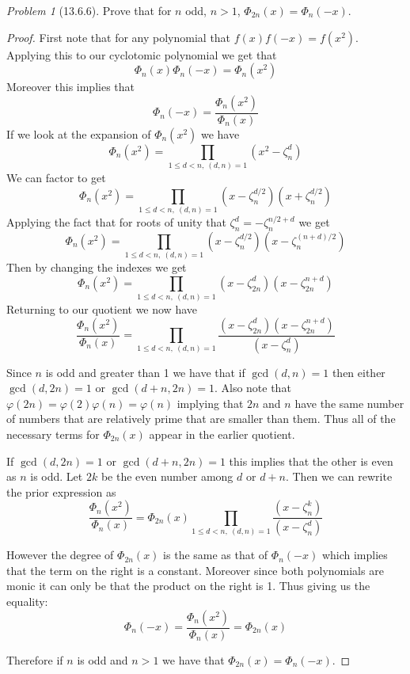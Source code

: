 \documentclass[10pt]{article}
\newcommand{\sk}{\vskip 10mm}
\theoremstyle{remark}
\newtheorem{problem}{Problem}
\theoremstyle{remark}
\begin{document}
\begin{problem}[13.6.6]
  Prove that for $n$ odd, $n>1$, $\Phi_{2n}(x)=\Phi_n(-x)$.
\end{problem}

\begin{proof}
  First note that for any polynomial that $f(x)f(-x)=f(x^2)$.
  Applying this to our cyclotomic polynomial we get that
  \[
    \Phi_n(x)\Phi_n(-x)=\Phi_n(x^2)
  \]
  Moreover this implies that
  \[
    \Phi_n(-x)=\frac{\Phi_n(x^2)}{\Phi_n(x)}
  \]
  If we look at the expansion of $\Phi_n(x^2)$ we have
  \[
    \Phi_n(x^2)=\prod_{1\leq d<n,\ (d,n)=1}(x^2-\zeta_n^d)
  \]
  We can factor to get
  \[
    \Phi_n(x^2)=\prod_{1\leq d<n,\ (d,n)=1}(x-\zeta_n^{d/2})(x+\zeta_n^{d/2})
  \]
  Applying the fact that for roots of unity that $\zeta_n^d=-\zeta_n^{n/2+d}$
  we get
  \[
    \Phi_n(x^2)=\prod_{1\leq d<n,\ (d,n)=1}(x-\zeta_n^{d/2})(x-\zeta_n^{(n+d)/2})
  \]
  Then by changing the indexes we get
  \[
    \Phi_n(x^2)=\prod_{1\leq d<n,\ (d,n)=1}(x-\zeta_{2n}^d)(x-\zeta_{2n}^{n+d})
  \]
  Returning to our quotient we now have
  \[
    \frac{\Phi_n(x^2)}{\Phi_n(x)}=\prod_{1\leq d<n,\ (d,n)=1}\frac{(x-\zeta_{2n}^d)(x-\zeta_{2n}^{n+d})}{(x-\zeta_n^d)}
  \]

  Since $n$ is odd and greater than 1 we have that if $\gcd(d,n)=1$ then either
  $\gcd(d,2n)=1$ or $\gcd(d+n,2n)=1$. Also note that $\varphi(2n)=\varphi(2)\varphi(n)=\varphi(n)$ implying
  that $2n$ and $n$ have the same number of numbers that are relatively prime that
  are smaller than them. Thus all of the necessary terms for $\Phi_{2n}(x)$ appear in
  the earlier quotient.

  If $\gcd(d,2n)=1$ or $\gcd(d+n,2n)=1$ this implies that the other is even
  as $n$ is odd. Let $2k$ be the even number among $d$ or $d+n$. Then we can
  rewrite the prior expression as
  \[
    \frac{\Phi_n(x^2)}{\Phi_n(x)}=\Phi_{2n}(x)\prod_{1\leq d<n,\ (d,n)=1}\frac{(x-\zeta_n^k)}{(x-\zeta_n^d)}
  \]

  However the degree of $\Phi_{2n}(x)$ is the same as that
  of $\Phi_n(-x)$ which implies that the term on the right
  is a constant. Moreover since both polynomials are
  monic it can only be that the product on the right is 1.
  Thus giving us the equality:
  \[
    \Phi_n(-x)=\frac{\Phi_n(x^2)}{\Phi_n(x)}=\Phi_{2n}(x)
  \]

  Therefore if $n$ is odd and $n>1$ we have that $\Phi_{2n}(x)=\Phi_n(-x)$.
\end{proof}

\sk
\end{document}
